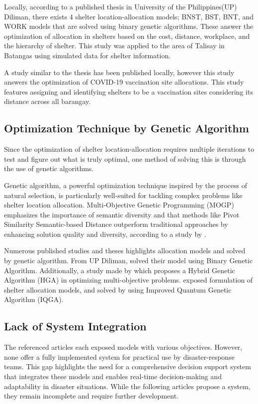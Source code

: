 	Locally, according to a published thesis in University of the Philippines(UP) Diliman, there exists 4 shelter location-allocation models; BNST, BST, BNT, and WORK models that are solved using binary genetic algorithms. These answer the optimization of allocation in shelters based on the cost, distance, workplace, and the hierarchy of shelter. This study was applied to the area of Talisay in Batangas using simulated data for shelter information.
	
	A study similar to the thesis has been published locally, however this study answers the optimization of COVID-19 vaccination site allocations\parencite{Kurt2021}. This study features assigning and identifying shelters to be a vaccination sites considering its distance across all barangay.

\subsection{Optimization Technique by Genetic Algorithm}
	Since the optimization of shelter location-allocation  requires multiple iterations to test and figure out what is truly optimal, one method of solving this is through the use of genetic algorithms.
	
	Genetic algorithm, a powerful optimization technique inspired by the process of natural selection, is particularly well-suited for tackling complex problems like shelter location allocation. Multi-Objective Genetic Programming (MOGP) emphasizes the importance of semantic diversity and that methods like Pivot Similarity Semantic-based Distance outperform traditional approaches by enhancing solution quality and diversity, according to a study by \textcite{Edgar2020}.
	
	Numerous published studies and theses highlights allocation models and solved by genetic algorithm. From UP Diliman, \textcite{LeahUP} solved their model using Binary Genetic Algorithm. Additionally, a study made by \textcite{Ahmed2020}  which proposes a Hybrid Genetic Algorithm (HGA) in optimizing multi-objective problems. \textcite{Yin2023} exposed formulation of shelter allocation models, and solved by using Improved Quantum Genetic Algorithm (IQGA). 
	

\subsection{Lack of System Integration}
	The referenced articles each exposed models with various objectives. However, none offer a fully implemented system for practical use by disaster-response teams. This gap highlights the need for a comprehensive decision support system that integrates these models and enables real-time decision-making and adaptability in disaster situations. While the following articles propose a system, they remain incomplete and require further development.
	
